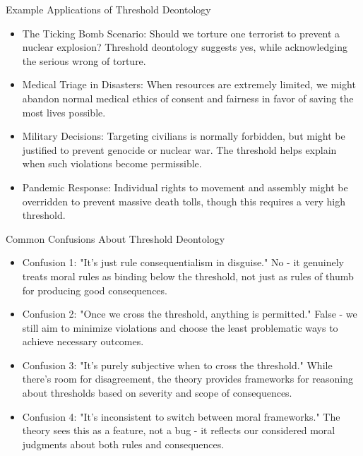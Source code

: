 \documentclass{beamer}
\begin{document}
\begin{frame}{Example Applications of Threshold Deontology}
\begin{itemize}
    \item The Ticking Bomb Scenario: Should we torture one terrorist to prevent a nuclear explosion? Threshold deontology suggests yes, while acknowledging the serious wrong of torture.
    
    \item Medical Triage in Disasters: When resources are extremely limited, we might abandon normal medical ethics of consent and fairness in favor of saving the most lives possible.
    
    \item Military Decisions: Targeting civilians is normally forbidden, but might be justified to prevent genocide or nuclear war. The threshold helps explain when such violations become permissible.
    
    \item Pandemic Response: Individual rights to movement and assembly might be overridden to prevent massive death tolls, though this requires a very high threshold.
\end{itemize}
\end{frame}

\begin{frame}{Common Confusions About Threshold Deontology}
\begin{itemize}
    \item Confusion 1: "It's just rule consequentialism in disguise." No - it genuinely treats moral rules as binding below the threshold, not just as rules of thumb for producing good consequences.
    
    \item Confusion 2: "Once we cross the threshold, anything is permitted." False - we still aim to minimize violations and choose the least problematic ways to achieve necessary outcomes.
    
    \item Confusion 3: "It's purely subjective when to cross the threshold." While there's room for disagreement, the theory provides frameworks for reasoning about thresholds based on severity and scope of consequences.
    
    \item Confusion 4: "It's inconsistent to switch between moral frameworks." The theory sees this as a feature, not a bug - it reflects our considered moral judgments about both rules and consequences.
\end{itemize}
\end{frame}
\end{document}
